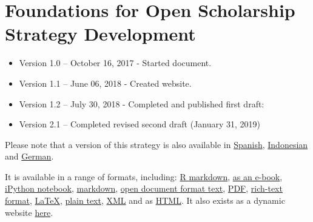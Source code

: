 \section{Foundations for Open Scholarship Strategy
Development}\label{foundations-for-open-scholarship-strategy-development}

\begin{itemize}
\tightlist
\item
  Version 1.0 -- October 16, 2017 - Started document.
\item
  Version 1.1 -- June 06, 2018 - Created website.
\item
  Version 1.2 -- July 30, 2018 - Completed and published first draft:
\end{itemize}

\begin{itemize}
\tightlist
\item
  Version 2.1 -- Completed revised second draft (January 31, 2019)
\end{itemize}

Please note that a version of this strategy is also available in
\href{https://github.com/Open-Scholarship-Strategy/indexed/blob/master/translations/spanish/index_es.md}{Spanish},
\href{https://sainsterbuka.readthedocs.io/en/latest/?fbclid=IwAR2eJ0xOMQdkbIbGt639frHFv0PdwK44HesXAsWBgVNXiXU1oZQRdn7TPrA}{Indonesian}
and
\href{https://github.com/Open-Scholarship-Strategy/indexed/blob/master/translations/german/index-de.md}{German}.

It is available in a range of formats, including:
\href{https://github.com/Open-Scholarship-Strategy/indexed/blob/master/ver_2/index.Rmd}{R
markdown},
\href{https://github.com/Open-Scholarship-Strategy/indexed/blob/master/ver_2/index.epub}{as
an e-book},
\href{https://github.com/Open-Scholarship-Strategy/indexed/blob/master/ver_2/index.ipynb}{iPython
notebook},
\href{https://github.com/Open-Scholarship-Strategy/indexed/blob/master/ver_2/index.md}{markdown},
\href{https://github.com/Open-Scholarship-Strategy/indexed/blob/master/ver_2/index.odt}{open
document format text},
\href{https://github.com/Open-Scholarship-Strategy/indexed/blob/master/ver_2/index.pdf}{PDF},
\href{https://github.com/Open-Scholarship-Strategy/indexed/blob/master/ver_2/index.rtf}{rich-text
format},
\href{https://github.com/Open-Scholarship-Strategy/indexed/blob/master/ver_2/index.tex}{LaTeX},
\href{https://github.com/Open-Scholarship-Strategy/indexed/blob/master/ver_2/index.txt}{plain
text},
\href{https://github.com/Open-Scholarship-Strategy/indexed/blob/master/ver_2/index.xml}{XML}
and as
\href{https://github.com/Open-Scholarship-Strategy/indexed/blob/master/ver_2/index_html.rar}{HTML}.
It also exists as a dynamic website
\href{https://open-scholarship-strategy.github.io/site/}{here}.

